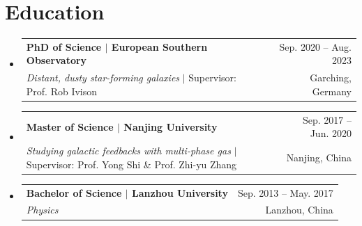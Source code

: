 \documentclass[A4,11pt]{article}
\makeatletter
\newcommand{\CVSubheading}[4]{
  \vspace{-2pt}\item
    \begin{tabular*}{0.97\textwidth}[t]{l@{\extracolsep{\fill}}r}
      \textbf{#1} & #2 \\
      \small#3 & \small #4 \\
    \end{tabular*}\vspace{-7pt}
}
\newcommand{\CVSubHeadingListStart}{\begin{itemize}[leftmargin=0.5cm, label={}]}
\newcommand{\CVSubHeadingListEnd}{\end{itemize}}
\makeatother
\begin{document}

\section{Education}
  \CVSubHeadingListStart
    \CVSubheading
    {{PhD of Science $|$ {\small{European Southern Observatory}}}}{Sep. 2020 -- Aug. 2023}
     {\emph{Distant, dusty star-forming galaxies} $|$ Supervisor: Prof. Rob Ivison}{Garching, Germany}
    \CVSubheading
      {{Master of Science $|$ {\small{Nanjing University}}}}{Sep. 2017 -- Jun. 2020}
      {\emph{Studying galactic feedbacks with multi-phase gas} $|$ Supervisor: Prof. Yong Shi \& Prof. Zhi-yu Zhang}{Nanjing, China}
    \CVSubheading
      {{Bachelor of Science $|$ {\small{Lanzhou University}}}}{Sep. 2013 -- May. 2017}
      {\emph{Physics}}{Lanzhou, China}
  \CVSubHeadingListEnd
\end{document}
